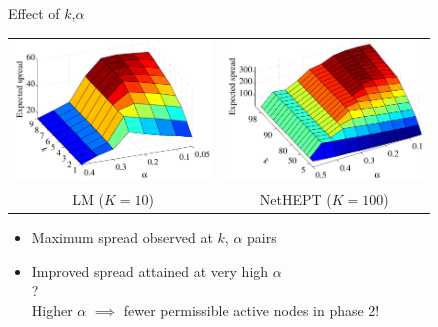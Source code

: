 \documentclass{beamer}
\newcommand{\kn}{$k$}
\begin{document}
\begin{frame}{Effect of \protect\kn,$\alpha$}
  \begin{center}
    \vspace{-5mm}
    \begin{tabular}{cc}
      \includegraphics[height = 3.7cm]{LM_3d_plot_cropped.pdf}
      &
      \includegraphics[height = 3.7cm]{Coverage_3d_TV_cropped.pdf}
      \\ %
      LM ($K=10$)
      &
      NetHEPT ($K=100$)
      \\ %
    \end{tabular}
  \end{center}
  \begin{itemize}
    \item Maximum spread observed at {\color{red}{high}} $k$, {\color{red}{low}} $\alpha$ pairs\\
    \item Improved spread {\color{red}{never}} attained at very high $\alpha$ \\
    \pause
    {\color{blue}{WHY}?} \\
    \pause
    Higher $\alpha$ $\implies$ fewer permissible active nodes in phase 2!
  \end{itemize}
\end{frame}
\end{document}
